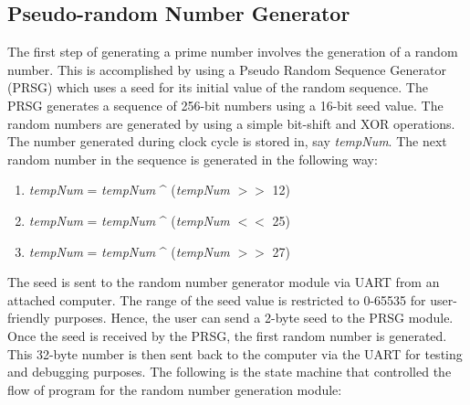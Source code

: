\documentclass[journal]{IEEEtran}
\begin{document}
\subsection{Pseudo-random Number Generator}
The first step of generating a prime number involves the generation of a random number. This is accomplished by using a Pseudo Random Sequence Generator (PRSG) which uses a seed for its initial value of the random sequence. The PRSG generates a sequence of 256-bit numbers using a 16-bit seed value. The random numbers are generated by using a simple bit-shift and XOR operations. The number generated during clock cycle is stored in, say \textit{tempNum}. The next random number in the sequence is generated in the following way: \\

\begin{enumerate}
	
	\item \textit{tempNum} = \textit{tempNum} \textrm{\textasciicircum} (\textit{tempNum} $>>$ 12)
	\item \textit{tempNum} = \textit{tempNum} \textrm{\textasciicircum} (\textit{tempNum} $<<$ 25)
	\item \textit{tempNum} = \textit{tempNum} \textrm{\textasciicircum} (\textit{tempNum} $>>$ 27) \\
	
\end{enumerate} 
 
The seed is sent to the random number generator module via UART from an attached computer. The range of the seed value is restricted to 0-65535 for user-friendly purposes. Hence, the user can send a 2-byte seed to the PRSG module. Once the seed is received by the PRSG, the first random number is generated. This 32-byte number is then sent back to the computer via the UART for testing and debugging purposes. The following is the state machine that controlled the flow of program for the random number generation module: \\
\end{document}
